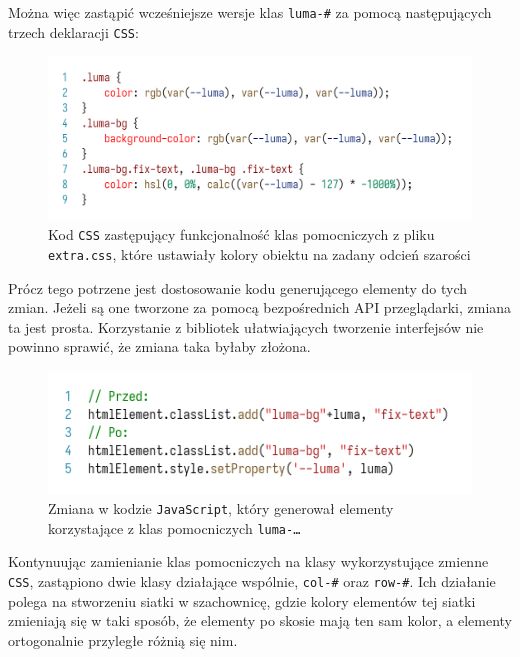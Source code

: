 \documentclass[licencjacka]{pracadypl}
\begin{document}
Można więc zastąpić wcześniejsze wersje klas \texttt{luma-\#} za pomocą następujących trzech deklaracji \texttt{CSS}:

\begin{figure}[H]
  \centering
  \includegraphics[width=\linewidth]{images/code-css-luma-all.png}
  \caption{Kod \texttt{CSS} zastępujący funkcjonalność klas pomocniczych z pliku \texttt{extra.css}, które ustawiały kolory obiektu na zadany odcień szarości}
  \label{fig:css-css-luma-all}
\end{figure}

Prócz tego potrzene jest dostosowanie kodu generującego elementy do tych zmian. Jeżeli są one tworzone za pomocą bezpośrednich API przeglądarki, zmiana ta jest prosta. Korzystanie z bibliotek ułatwiających tworzenie interfejsów nie powinno sprawić, że zmiana taka byłaby złożona.

\begin{figure}[H]
  \centering
  \includegraphics[width=\linewidth]{images/code-js-luma-adjust.png}
  \caption{Zmiana w kodzie \texttt{JavaScript}, który generował elementy korzystające z klas pomocniczych \texttt{luma-\dots}}
  \label{fig:code-js-luma-adjust}
\end{figure}

Kontynuując zamienianie klas pomocniczych na klasy wykorzystujące zmienne \texttt{CSS}, zastąpiono dwie klasy działające wspólnie, \texttt{col-\#} oraz \texttt{row-\#}. Ich działanie polega na stworzeniu siatki w szachownicę, gdzie kolory elementów tej siatki zmieniają się w taki sposób, że elementy po skosie mają ten sam kolor, a elementy ortogonalnie przyległe różnią się nim.
\end{document}
